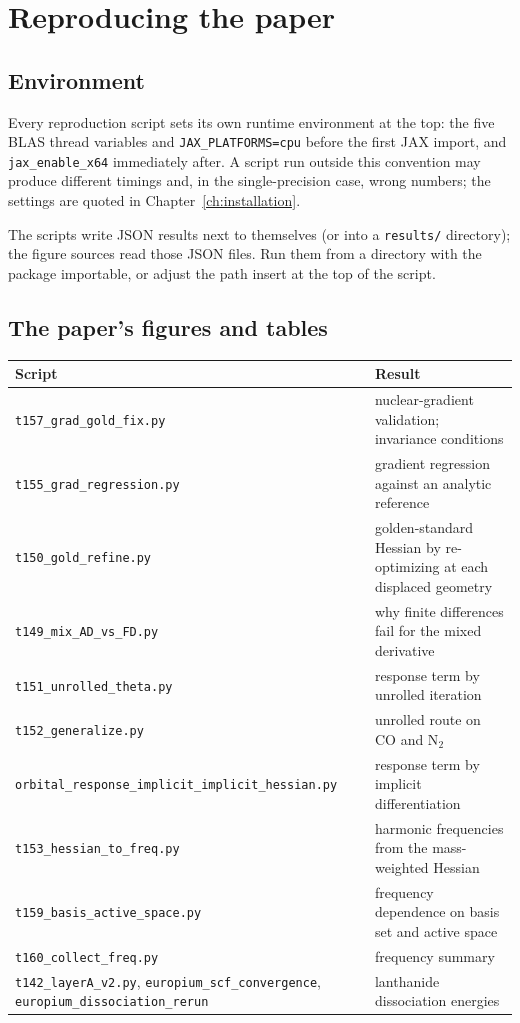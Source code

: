\chapter{Reproducing the paper}
\label{ch:reproducing}

\section{Environment}

Every reproduction script sets its own runtime environment at the top:
the five BLAS thread variables and \texttt{JAX\_PLATFORMS=cpu} before
the first JAX import, and \texttt{jax\_enable\_x64} immediately after.
A script run outside this convention may produce different timings and,
in the single-precision case, wrong numbers; the settings are quoted in
Chapter~\ref{ch:installation}.

The scripts write JSON results next to themselves (or into a
\texttt{results/} directory); the figure sources read those JSON files.
Run them from a directory with the package importable, or adjust the
path insert at the top of the script.

\section{The paper's figures and tables}

\begin{center}
\begin{tabularx}{\textwidth}{>{\raggedright\arraybackslash}p{}X}
\toprule
Script & Result \\
\midrule
\texttt{t157\_grad\_gold\_fix.py} & nuclear-gradient validation; invariance conditions \\
\texttt{t155\_grad\_regression.py} & gradient regression against an analytic reference \\
\texttt{t150\_gold\_refine.py} & golden-standard Hessian by re-optimizing at each displaced geometry \\
\texttt{t149\_mix\_AD\_vs\_FD.py} & why finite differences fail for the mixed derivative \\
\texttt{t151\_unrolled\_theta.py} & response term by unrolled iteration \\
\texttt{t152\_generalize.py} & unrolled route on CO and N$_2$ \\
\texttt{orbital\_response\_implicit\_\allowbreak implicit\_hessian.py} & response term by implicit differentiation \\
\texttt{t153\_hessian\_to\_freq.py} & harmonic frequencies from the mass-weighted Hessian \\
\texttt{t159\_basis\_active\_space.py} & frequency dependence on basis set and active space \\
\texttt{t160\_collect\_freq.py} & frequency summary \\
\texttt{t142\_layerA\_v2.py}, \texttt{europium\_scf\_convergence}, \texttt{europium\_dissociation\_rerun} & lanthanide dissociation energies \\
\bottomrule
\end{tabularx}
\end{center}

